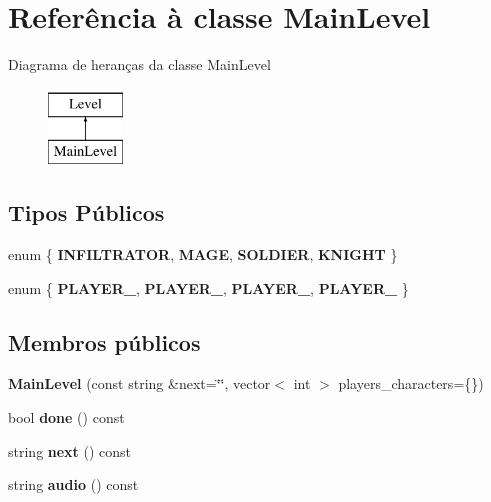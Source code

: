 \hypertarget{classMainLevel}{}\section{Referência à classe Main\+Level}
\label{classMainLevel}
Diagrama de heranças da classe Main\+Level\begin{figure}[H]
\begin{center}
\leavevmode
\includegraphics[height=2.000000cm]{classMainLevel}
\end{center}
\end{figure}
\subsection*{Tipos Públicos}
\begin{DoxyCompactItemize}
\item 
\mbox{\label{classMainLevel_a19d15012888b099ef2d53e1a0e7d1b97}} 
enum \{ {\bfseries I\+N\+F\+I\+L\+T\+R\+A\+T\+OR}, 
{\bfseries M\+A\+GE}, 
{\bfseries S\+O\+L\+D\+I\+ER}, 
{\bfseries K\+N\+I\+G\+HT}
 \}
\item 
\mbox{\label{classMainLevel_a25d9f3e3c424008626bd8bfc5c3e9dac}} 
enum \{ {\bfseries P\+L\+A\+Y\+E\+R\+\_}, 
{\bfseries P\+L\+A\+Y\+E\+R\+\_}, 
{\bfseries P\+L\+A\+Y\+E\+R\+\_}, 
{\bfseries P\+L\+A\+Y\+E\+R\+\_}
 \}
\end{DoxyCompactItemize}
\subsection*{Membros públicos}
\begin{DoxyCompactItemize}
\item 
\mbox{\label{classMainLevel_a0d8c61bddf5781cea1ba8496bd0a3d80}} 
{\bfseries Main\+Level} (const string \&next=\char`\"{}\char`\"{}, vector$<$ int $>$ players\+\_\+characters=\{\})
\item 
\mbox{\label{classMainLevel_ae4d34d88753d7ebe90320e3cdd3e9e17}} 
bool {\bfseries done} () const
\item 
\mbox{\label{classMainLevel_ac5631405cb489d6ca9d90eb385c91293}} 
string {\bfseries next} () const
\item 
\mbox{\label{classMainLevel_ae101ab154173ca819a5eb701508ad635}} 
string {\bfseries audio} () const
\end{DoxyCompactItemize}
